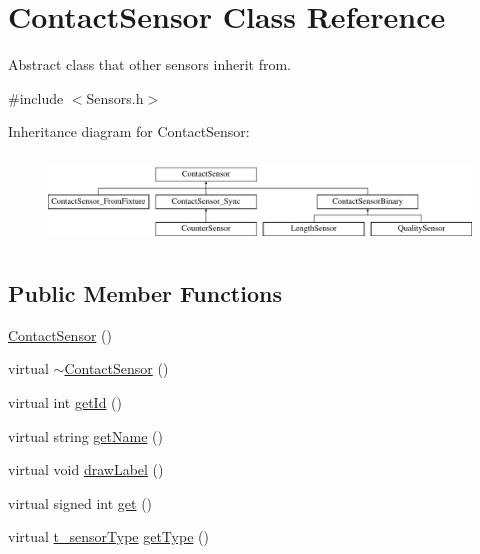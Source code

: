 \hypertarget{classContactSensor}{\section{Contact\-Sensor Class Reference}
\label{classContactSensor}
}


Abstract class that other sensors inherit from.  




{\ttfamily \#include $<$Sensors.\-h$>$}

Inheritance diagram for Contact\-Sensor\-:\begin{figure}[H]
\begin{center}
\leavevmode
\includegraphics[height=2.359551cm]{classContactSensor}
\end{center}
\end{figure}
\subsection*{Public Member Functions}
\begin{DoxyCompactItemize}
\item 
\hyperlink{classContactSensor_adf00bb183bcb37206adb5c036e1ad3c6}{Contact\-Sensor} ()
\item 
virtual \hyperlink{classContactSensor_a460963ef5eebd0100d404f64a32149e5}{$\sim$\-Contact\-Sensor} ()
\item 
virtual int \hyperlink{classContactSensor_a14992f0e2aef3d04eca7b27bd2b2d10b}{get\-Id} ()
\item 
virtual string \hyperlink{classContactSensor_ad3f3a4b786f7d6f23caac69374dff999}{get\-Name} ()
\item 
virtual void \hyperlink{classContactSensor_ae08a9a4b2e44ec4ab2a33a482d4d286d}{draw\-Label} ()
\item 
virtual signed int \hyperlink{classContactSensor_af616ebea2da4d9fd0dacdf71eb8b32d9}{get} ()
\item 
virtual \hyperlink{Sensors_8h_a4e6d557e949865ee922fadfafd5ed0ba}{t\-\_\-sensor\-Type} \hyperlink{classContactSensor_a3ba841014a5fdaf313b555527f46595e}{get\-Type} ()
\end{DoxyCompactItemize}
